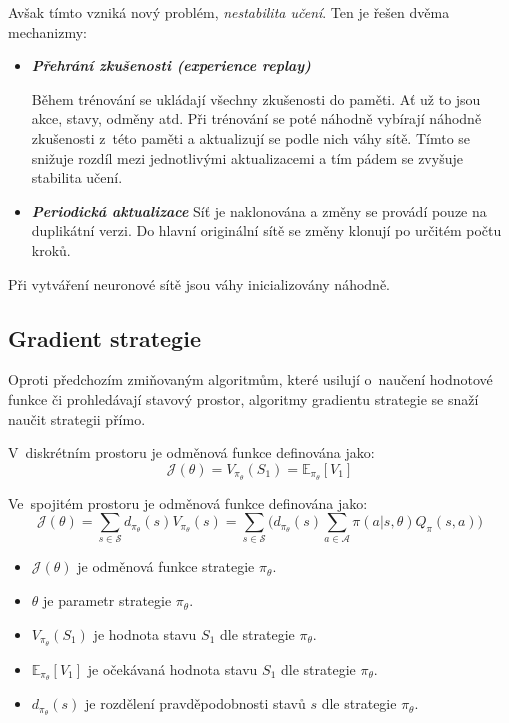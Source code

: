 Avšak tímto vzniká nový problém, \emph{nestabilita učení}.
Ten je řešen dvěma mechanizmy:

\begin{itemize}
  \item \textbf{\emph{Přehrání zkušenosti (experience replay)}}
  
  Během trénování se ukládají všechny zkušenosti do paměti.
  Ať už to jsou akce, stavy, odměny atd.
  Při trénování se poté náhodně vybírají náhodně zkušenosti z~této paměti a aktualizují se podle nich váhy sítě.
  Tímto se snižuje rozdíl mezi jednotlivými aktualizacemi a tím pádem se zvyšuje stabilita učení.
  

  \item \textbf{\emph{Periodická aktualizace}}
  Síť je naklonována a změny se provádí pouze na duplikátní verzi.
  Do hlavní originální sítě se změny klonují po určitém počtu kroků.

\end{itemize}

Při vytváření neuronové sítě jsou váhy inicializovány náhodně.

\subsection{Gradient strategie}\label{subsec:gradient-strategie}
Oproti předchozím zmiňovaným algoritmům, které usilují o~naučení hodnotové funkce či prohledávají stavový prostor, algoritmy gradientu strategie se snaží naučit strategii přímo.

V~diskrétním prostoru je odměnová funkce definována jako:
\begin{equation}
  \label{eq:odmenova_funkce}
  \mathcal{J}(\theta) = V_{\pi_\theta}(S_1) = \mathbb{E}_{\pi_\theta}[V_1]
\end{equation}

Ve~spojitém prostoru je odměnová funkce definována jako:
\begin{equation}
    \label{eq:odmenova_funkce_spojita}
  \mathcal{J}(\theta) = \sum_{s \in \mathcal{S}} d_{\pi_\theta}(s) V_{\pi_\theta}(s) = \sum_{s \in \mathcal{S}} \Big( d_{\pi_\theta}(s) \sum_{a \in \mathcal{A}} \pi(a \vert s, \theta) Q_\pi(s, a) \Big)
  \end{equation}

\begin{itemize}
  \item $\mathcal{J}(\theta)$ je odměnová funkce strategie $\pi_\theta$.
  \item $\theta$ je parametr strategie $\pi_\theta$.
  \item $V_{\pi_\theta}(S_1)$ je hodnota stavu $S_1$ dle strategie $\pi_\theta$.
  \item $\mathbb{E}_{\pi_\theta}[V_1]$ je očekávaná hodnota stavu $S_1$ dle strategie $\pi_\theta$.
  \item $d_{\pi_\theta}(s)$ je rozdělení pravděpodobnosti stavů $s$ dle strategie $\pi_\theta$.
\end{itemize}

